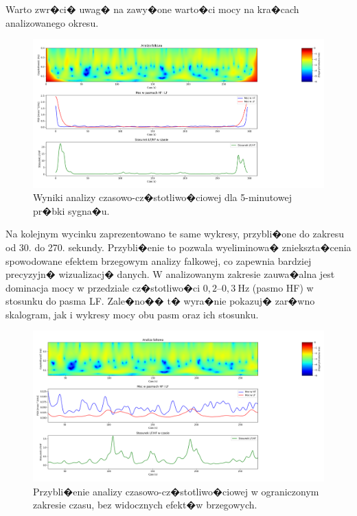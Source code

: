 Warto zwr�ci� uwag� na zawy�one warto�ci mocy na kra�cach analizowanego okresu.

\begin{figure}
    \centering
    \includegraphics[scale=0.25]{Rysunki/waveFAR.png}
    \caption{Wyniki analizy czasowo-cz�stotliwo�ciowej dla 5-minutowej pr�bki sygna�u.}

    \label{fig:wave_normal}
\end{figure}

Na kolejnym wycinku zaprezentowano te same wykresy, przybli�one do zakresu od
30. do 270. sekundy. Przybli�enie to pozwala wyeliminowa� zniekszta�cenia
spowodowane efektem brzegowym analizy falkowej, co zapewnia bardziej precyzyjn�
wizualizacj� danych. W analizowanym zakresie zauwa�alna jest dominacja mocy w
przedziale cz�stotliwo�ci \(0,2\text{--}0,3\ \text{Hz}\) (pasmo HF) w stosunku
do pasma LF. Zale�no�� t� wyra�nie pokazuj� zar�wno skalogram, jak i wykresy
mocy obu pasm oraz ich stosunku.

\begin{figure}
    \centering
    \includegraphics[scale=0.25]{Rysunki/waveCLOSE.png}
    \caption{Przybli�enie analizy czasowo-cz�stotliwo�ciowej w ograniczonym zakresie czasu, bez widocznych efekt�w brzegowych.}
    \label{fig:wave_zoomed}
\end{figure}

